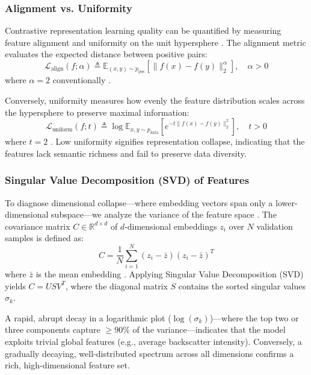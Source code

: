 \documentclass[12pt]{article}
\begin{document}
\subsubsection{Alignment vs. Uniformity}
Contrastive representation learning quality can be quantified by measuring feature alignment and uniformity on the unit hypersphere \cite{contrastive_ablation}. The alignment metric evaluates the expected distance between positive pairs:
\begin{equation}
\mathcal{L}_{\text{align}}(f; \alpha) \triangleq \mathbb{E}_{(x,y)\sim p_{\text{pos}}}\left[\|f(x) - f(y)\|^\alpha_2\right], \quad \alpha > 0
\end{equation}
where $\alpha=2$ conventionally \cite{contrastive_ablation}. 

Conversely, uniformity measures how evenly the feature distribution scales across the hypersphere to preserve maximal information:
\begin{equation}
\mathcal{L}_{\text{uniform}}(f; t) \triangleq \log \mathbb{E}_{x, y \sim p_{\text{data}}}\left[e^{-t\|f(x) - f(y)\|^2_2}\right], \quad t > 0
\end{equation}
where $t=2$ \cite{contrastive_ablation}. Low uniformity signifies representation collapse, indicating that the features lack semantic richness and fail to preserve data diversity.

\subsubsection{Singular Value Decomposition (SVD) of Features}
To diagnose dimensional collapse—where embedding vectors span only a lower-dimensional subspace—we analyze the variance of the feature space \cite{svd_ablation}. The covariance matrix $C \in \mathbb{R}^{d \times d}$ of $d$-dimensional embeddings $z_i$ over $N$ validation samples is defined as:
\begin{equation}
C = \frac{1}{N} \sum_{i=1}^N (z_i - \bar{z})(z_i - \bar{z})^T
\end{equation}
where $\bar{z}$ is the mean embedding \cite{svd_ablation}. Applying Singular Value Decomposition (SVD) yields $C = U S V^T$, where the diagonal matrix $S$ contains the sorted singular values $\sigma_k$. 

A rapid, abrupt decay in a logarithmic plot ($\log(\sigma_k)$)—where the top two or three components capture $\ge 90\%$ of the variance—indicates that the model exploits trivial global features (e.g., average backscatter intensity). Conversely, a gradually decaying, well-distributed spectrum across all dimensions confirms a rich, high-dimensional feature set.
\end{document}
